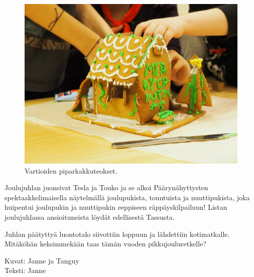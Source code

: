 \begin{multicols}{2}
\begin{figure}[p]
\vspace*{.05\textwidth}

\includegraphics[width=.475\textwidth,height=.475\textwidth,keepaspectratio]{assets/pipari5}

\caption{Vartioiden piparkakkuteokset.}
\end{figure}

Joulujuhlan juonsivat Tesla ja Touko ja se alkoi Päärynähyttysten 
spektaakkelimaisella näytelmällä joulupukista, tountuista ja nuuttipukista, 
joka huipentui joulupukin ja nuuttipukin eeppiseen räppäyskilpailuun! Listan 
joulujuhlassa ansioituneista löydät edellisestä Tassusta.

Juhlan päätyttyä luontotalo siivottiin loppuun ja lähdettiin kotimatkalle. 
Mitäköhän keksimmekään taas tämän vuoden pikkujouluretkelle?
\end{multicols}

\medskip

\noindent\null\hfill Kuvat: Janne ja Tanguy\\
\noindent\null\hfill Teksti: Janne
